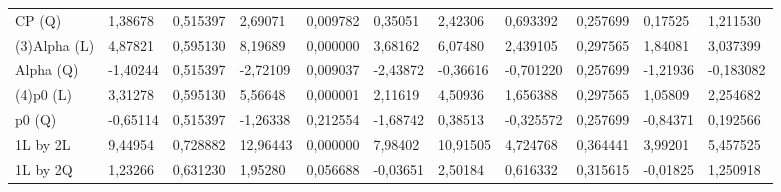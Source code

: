 \begin{table}[H]
{\begin{tabular}{lllllllllll}
CP      (Q)    & {\color[HTML]{FF0000} 1,38678}  & {\color[HTML]{FF0000} 0,515397} & {\color[HTML]{FF0000} 2,69071}  & {\color[HTML]{FF0000} 0,009782} & {\color[HTML]{FF0000} 0,35051}  & {\color[HTML]{FF0000} 2,42306}  & {\color[HTML]{FF0000} 0,693392}  & {\color[HTML]{FF0000} 0,257699} & {\color[HTML]{FF0000} 0,17525}  & {\color[HTML]{FF0000} 1,211530}  \\
\rowcolor[HTML]{FFFFFF} 
(3)Alpha   (L) & {\color[HTML]{FF0000} 4,87821}  & {\color[HTML]{FF0000} 0,595130} & {\color[HTML]{FF0000} 8,19689}  & {\color[HTML]{FF0000} 0,000000} & {\color[HTML]{FF0000} 3,68162}  & {\color[HTML]{FF0000} 6,07480}  & {\color[HTML]{FF0000} 2,439105}  & {\color[HTML]{FF0000} 0,297565} & {\color[HTML]{FF0000} 1,84081}  & {\color[HTML]{FF0000} 3,037399}  \\
\rowcolor[HTML]{FFFFFF} 
Alpha   (Q)    & {\color[HTML]{FF0000} -1,40244} & {\color[HTML]{FF0000} 0,515397} & {\color[HTML]{FF0000} -2,72109} & {\color[HTML]{FF0000} 0,009037} & {\color[HTML]{FF0000} -2,43872} & {\color[HTML]{FF0000} -0,36616} & {\color[HTML]{FF0000} -0,701220} & {\color[HTML]{FF0000} 0,257699} & {\color[HTML]{FF0000} -1,21936} & {\color[HTML]{FF0000} -0,183082} \\
\rowcolor[HTML]{FFFFFF} 
(4)p0      (L) & {\color[HTML]{FF0000} 3,31278}  & {\color[HTML]{FF0000} 0,595130} & {\color[HTML]{FF0000} 5,56648}  & {\color[HTML]{FF0000} 0,000001} & {\color[HTML]{FF0000} 2,11619}  & {\color[HTML]{FF0000} 4,50936}  & {\color[HTML]{FF0000} 1,656388}  & {\color[HTML]{FF0000} 0,297565} & {\color[HTML]{FF0000} 1,05809}  & {\color[HTML]{FF0000} 2,254682}  \\
\rowcolor[HTML]{FFFFFF} 
p0      (Q)    & {\color[HTML]{333333} -0,65114} & {\color[HTML]{333333} 0,515397} & {\color[HTML]{333333} -1,26338} & {\color[HTML]{333333} 0,212554} & {\color[HTML]{333333} -1,68742} & {\color[HTML]{333333} 0,38513}  & {\color[HTML]{333333} -0,325572} & {\color[HTML]{333333} 0,257699} & {\color[HTML]{333333} -0,84371} & {\color[HTML]{333333} 0,192566}  \\
\rowcolor[HTML]{FFFFFF} 
1L by 2L       & {\color[HTML]{FF0000} 9,44954}  & {\color[HTML]{FF0000} 0,728882} & {\color[HTML]{FF0000} 12,96443} & {\color[HTML]{FF0000} 0,000000} & {\color[HTML]{FF0000} 7,98402}  & {\color[HTML]{FF0000} 10,91505} & {\color[HTML]{FF0000} 4,724768}  & {\color[HTML]{FF0000} 0,364441} & {\color[HTML]{FF0000} 3,99201}  & {\color[HTML]{FF0000} 5,457525}  \\
\rowcolor[HTML]{FFFFFF} 
1L by 2Q       & {\color[HTML]{333333} 1,23266}  & {\color[HTML]{333333} 0,631230} & {\color[HTML]{333333} 1,95280}  & {\color[HTML]{333333} 0,056688} & {\color[HTML]{333333} -0,03651} & {\color[HTML]{333333} 2,50184}  & {\color[HTML]{333333} 0,616332}  & {\color[HTML]{333333} 0,315615} & {\color[HTML]{333333} -0,01825} & {\color[HTML]{333333} 1,250918}  \\

\end{tabular}}
\end{table}
